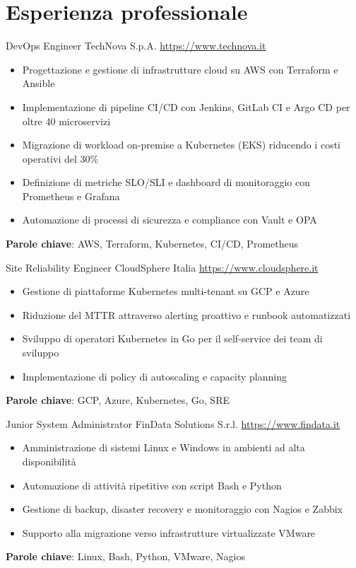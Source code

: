 \documentclass[a4paper, serif, 10pt]{moderncv}
\begin{document}
\section{Esperienza professionale}

        {DevOps Engineer}
        {TechNova S.p.A.}
        {\url{https://www.technova.it}}
        {}
        {\begin{itemize}
\item Progettazione e gestione di infrastrutture cloud su AWS con Terraform e Ansible
\item Implementazione di pipeline CI/CD con Jenkins, GitLab CI e Argo CD per oltre 40 microservizi
\item Migrazione di workload on-premise a Kubernetes (EKS) riducendo i costi operativi del 30\%
\item Definizione di metriche SLO/SLI e dashboard di monitoraggio con Prometheus e Grafana
\item Automazione di processi di sicurezza e compliance con Vault e OPA
\end{itemize}
\textbf{Parole chiave}: AWS, Terraform, Kubernetes, CI/CD, Prometheus}

        {Site Reliability Engineer}
        {CloudSphere Italia}
        {\url{https://www.cloudsphere.it}}
        {}
        {\begin{itemize}
\item Gestione di piattaforme Kubernetes multi-tenant su GCP e Azure
\item Riduzione del MTTR attraverso alerting proattivo e runbook automatizzati
\item Sviluppo di operatori Kubernetes in Go per il self-service dei team di sviluppo
\item Implementazione di policy di autoscaling e capacity planning
\end{itemize}
\textbf{Parole chiave}: GCP, Azure, Kubernetes, Go, SRE}

        {Junior System Administrator}
        {FinData Solutions S.r.l.}
        {\url{https://www.findata.it}}
        {}
        {\begin{itemize}
\item Amministrazione di sistemi Linux e Windows in ambienti ad alta disponibilità
\item Automazione di attività ripetitive con script Bash e Python
\item Gestione di backup, disaster recovery e monitoraggio con Nagios e Zabbix
\item Supporto alla migrazione verso infrastrutture virtualizzate VMware
\end{itemize}
\textbf{Parole chiave}: Linux, Bash, Python, VMware, Nagios}
\end{document}
